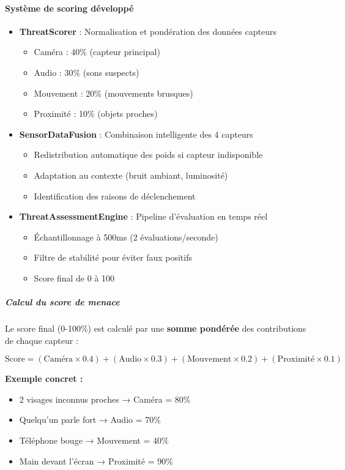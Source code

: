 \documentclass[11pt,a4paper]{article}
\begin{document}
\paragraph{Système de scoring développé}
\begin{itemize}
    \item \textbf{ThreatScorer} : Normalisation et pondération des données capteurs
    \begin{itemize}
        \item Caméra : 40\% (capteur principal)
        \item Audio : 30\% (sons suspects)
        \item Mouvement : 20\% (mouvements brusques)
        \item Proximité : 10\% (objets proches)
    \end{itemize}
    \item \textbf{SensorDataFusion} : Combinaison intelligente des 4 capteurs
    \begin{itemize}
        \item Redistribution automatique des poids si capteur indisponible
        \item Adaptation au contexte (bruit ambiant, luminosité)
        \item Identification des raisons de déclenchement
    \end{itemize}
    \item \textbf{ThreatAssessmentEngine} : Pipeline d'évaluation en temps réel
    \begin{itemize}
        \item Échantillonnage à 500ms (2 évaluations/seconde)
        \item Filtre de stabilité pour éviter faux positifs
        \item Score final de 0 à 100
    \end{itemize}
\end{itemize}

\subparagraph{Calcul du score de menace}
Le score final (0-100\%) est calculé par une \textbf{somme pondérée} des contributions de chaque capteur :

\begin{equation}
\text{Score} = (\text{Caméra} \times 0.4) + (\text{Audio} \times 0.3) + (\text{Mouvement} \times 0.2) + (\text{Proximité} \times 0.1)
\end{equation}

\textbf{Exemple concret :}
\begin{itemize}
    \item 2 visages inconnus proches → Caméra = 80\%
    \item Quelqu'un parle fort → Audio = 70\%
    \item Téléphone bouge → Mouvement = 40\%
    \item Main devant l'écran → Proximité = 90\%
\end{itemize}
\end{document}
